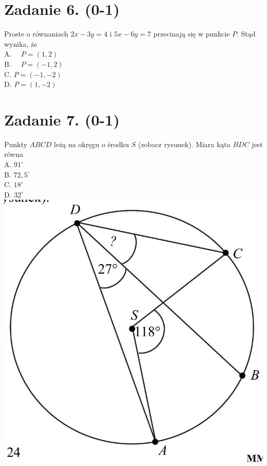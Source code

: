 \documentclass[10pt]{article}
\begin{document}
\section*{Zadanie 6. (0-1)}
Proste o równaniach \(2 x-3 y=4\) i \(5 x-6 y=7\) przecinają się w punkcie \(P\). Stąd wynika, że\\
A. \(\quad P=(1,2)\)\\
B. \(\quad P=(-1,2)\)\\
C. \(P=(-1,-2)\)\\
D. \(P=(1,-2)\)

\section*{Zadanie 7. (0-1)}
Punkty \(A B C D\) leżą na okręgu o środku \(S\) (zobacz rysunek). Miara kąta \(B D C\) jest równa\\
A. \(91^{\circ}\)\\
B. \(72,5^{\circ}\)\\
C. \(18^{\circ}\)\\
D. \(32^{\circ}\)\\
\includegraphics[max width=\textwidth, center]{2024_11_21_1c92fcc0db78c9202015g-02}
\end{document}
